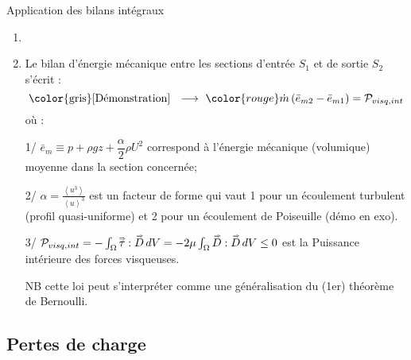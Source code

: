 \begin{frame}{Application des bilans intégraux}
\begin{enumerate}
\item[]
\item
	Le \textcolor{vert}{bilan d'énergie mécanique} entre les sections d'entrée $S_1$
  et de sortie $S_2$ s'écrit :
	\[
		\mbox{\color{gris} [Démonstration] \; $\longrightarrow$ \;}
		\color{rouge}
		\dot{m} \left( \bar{e}_{m2} - \bar{e}_{m1} \right) = {\cal P}_{visq,int}	\]
	où :
	
	
	
	1/ 	$
		\bar{e}_m \equiv p + \rho g z 
		+ \dfrac{\alpha}{2}\rho U^2
	$
	correspond à l'énergie mécanique (volumique) moyenne dans la section concernée; 
	
	2/ $\alpha =  \frac{\left< u^3 \right>}{\left< u \right>^3}$ est un facteur de forme qui vaut 1 pour un écoulement turbulent (profil quasi-uniforme) et 2 pour un écoulement de Poiseuille (démo en exo).
	
	3/   
	${\cal P}_{visq,int} = - \int_\Omega \accentset{\Rightarrow}{\tau}: \accentset{\Rightarrow}{D} \, dV =- 2\mu  \int_\Omega \accentset{\Rightarrow}{D} : \accentset{\Rightarrow}{D} \, dV \le 0
      $ est la Puissance intérieure des forces visqueuses.

	NB cette loi peut s'interpréter comme une généralisation du (1er) théorème de Bernoulli.
	
	

\end{enumerate}

\vspace{0mm}

\end{frame}

\subsection{Pertes de charge}

